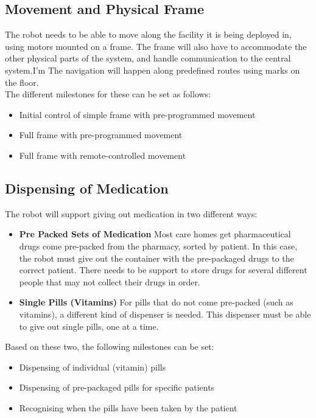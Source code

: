 \documentclass[a4paper,10pt,DIV10,openright,openbib]{scrreprt}
\begin{document}
\subsection{Movement and Physical Frame}
The robot needs to be able to move along the facility it is being deployed in, using
motors mounted on a frame. The frame will also have to accommodate the other
physical parts of the system, and handle communication to the central system.I'm 
The navigation will happen along predefined routes using marks on the floor.\\
The different milestones for these can be set as follows:
\begin{itemize}
  \item Initial control of simple frame with pre-programmed movement
  \item Full frame with pre-programmed movement
  \item Full frame with remote-controlled movement
\end{itemize}

\subsection{Dispensing of Medication}
The robot will support giving out medication in two different ways:
\begin{itemize}
  \item \textbf{Pre Packed Sets of Medication} Most care homes get pharmaceutical drugs come
pre-packed from the pharmacy, sorted by patient. In this case, the robot must
give out the container with the pre-packaged drugs to the correct patient. There
needs to be support to store drugs for several different people that may not
collect their drugs in order.
  \item \textbf{Single Pills (Vitamins)} For pills that do not come pre-packed
(such as vitamins), a different kind of dispenser is needed. This dispenser must
be able to give out single pills, one at a time.
\end{itemize}
Based on these two, the following milestones can be set:
\begin{itemize}
  \item Dispensing of individual (vitamin) pills
  \item Dispensing of pre-packaged pills for specific patients
  \item Recognising when the pills have been taken by the patient
\end{itemize}
\end{document}
